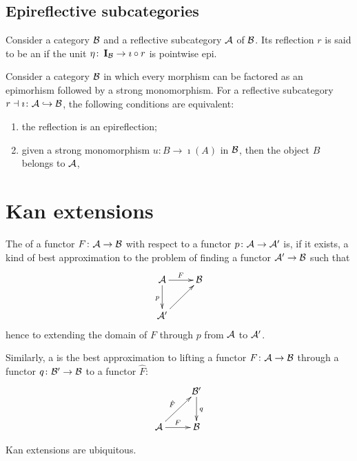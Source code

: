 \subsection{Epireflective subcategories}
  \begin{defn}
    Consider a category ${\cal B}$ and a reflective subcategory ${\cal A}$ of ${\cal B}$. Its reflection $r$ is said to be an  if the unit $\eta\colon\operatorname{\mathbf{I}}_{{\cal B}}\to\imath\circ r$ is pointwise epi.
  \end{defn}

  \begin{prop}
    Consider a category ${\cal B}$ in which every morphism can be factored as an epimorhism followed by a strong monomorphism. For a reflective subcategory $r\dashv\imath\colon{\cal A}\hookrightarrow{\cal B}$, the following conditions are equivalent:
    \begin{enumerate}
      \item the reflection is an epireflection;
      \item given a strong monomorphism $u\colon B\to\imath(A)$ in ${\cal B}$, then the object $B$ belongs to ${\cal A}$,
    \end{enumerate}
  \end{prop}

\newpage
\section{Kan extensions}
  The  of a functor $F\colon{\cal A}\to{\cal B}$ with respect to a functor $p\colon{\cal A}\to{\cal A}'$ is, if it exists, a kind of best approximation to the problem of finding a functor ${\cal A}'\to{\cal B}$ such that
      \begin{displaymath}
        \xymatrix{
          \Aa\ar[r]^{F}\ar[d]_{p}&\Bb\\
          \Aa'\ar[ur]&
         }
      \end{displaymath}
  hence to extending the domain of $F$ through $p$ from ${\cal A}$ to ${\cal A}'$.

  Similarly, a  is the best approximation to lifting a functor $F\colon{\cal A}\to{\cal B}$ through a functor $q\colon{\cal B}'\to{\cal B}$ to a functor $\hat{F}$:
      \begin{displaymath}
        \xymatrix{
          &\Bb'\ar[d]^{q}\\
          \Aa\ar[ur]^{\hat{F}}\ar[r]^{F}&\Bb
         }
      \end{displaymath}

  Kan extensions are ubiquitous.

